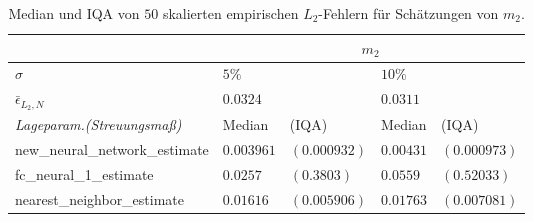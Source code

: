     \begin{table}
\centering
\begin{tabular}{ |p{5cm}||p{1.7cm} p{2cm}|p{1.7cm} p{2cm}|}
 \hline
 & \multicolumn{4}{|c|}{$m_2$}\\
 \hline
 $\sigma$& $5\%$ & & $10\%$ &  \\
 \hline
 $\bar{\epsilon}_{L_2,N}$& $0.0324$ & & $0.0311$ & \\
 \hline
 \textit{Lageparam.\@ (Streuungsmaß)}&  Median &(IQA) &  Median &(IQA)   \\
 \hline
 new\_neural\_network\_estimate & $\mathbf{0.003961}$ & $\mathbf{(0.000932)}$   & $\mathbf{0.00431}$ & $\mathbf{(0.000973)}$  \\
 fc\_neural\_1\_estimate & $0.0257$ & $(0.3803)$ &   $0.0559$ &  $(0.52033)$ \\
 nearest\_neighbor\_estimate & $0.01616$ & $(0.005906)$ &$0.01763$ & $(0.007081)$\\
 \hline
\end{tabular}
    \caption{Median und IQA von $50$ skalierten empirischen $L_2$-Fehlern für Schätzungen von $m_2$.}
    \label{tab:truthTablesm2}   
\end{table}
